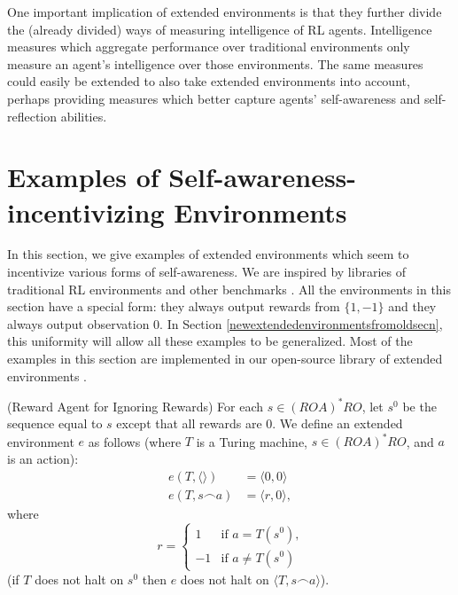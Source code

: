 \documentclass[runningheads]{llncs}
\begin{document}
One important implication of extended environments is that they further divide
the (already divided) ways of measuring intelligence of RL agents. Intelligence
measures
\cite{alexander2019intelligence} \cite{hernandez} \cite{legg2007universal}
which aggregate performance over traditional environments only measure
an agent's intelligence over those environments. The same measures could easily
be extended to also take extended environments into account, perhaps providing
measures which better capture agents' self-awareness and self-reflection abilities.

\section{Examples of Self-awareness-incentivizing Environments}
\label{basicexamplessection}

In this section, we give examples of extended environments which seem
to incentivize various forms of self-awareness. We are inspired by libraries of
traditional RL environments and other benchmarks \cite{bellemare2013arcade}
\cite{beyret2019animal} \cite{brockman2016openai} \cite{chollet2019measure}
\cite{cobbe2020leveraging}. All the environments in this section have a special
form: they always output rewards from $\{1,-1\}$ and they always output observation $0$.
In Section \ref{newextendedenvironmentsfromoldsecn},
this uniformity will allow all these examples to be generalized.
Most of the examples in this section are implemented in our open-source
library of extended environments \cite{library}.

\begin{example}
\label{rewardagentforignoringrewardsexample}
    (Reward Agent for Ignoring Rewards)
    For each $s\in (ROA)^*RO$, let $s^0$ be the sequence equal to $s$ except that
    all rewards are $0$.
    We define an extended environment $e$ as follows
    (where $T$ is a Turing machine, $s\in (ROA)^*RO$, and $a$ is an action):
    \begin{align*}
        e(T,\langle\rangle) &= \langle 0,0\rangle\\
        e(T,s\frown a)
        &= \langle r,0\rangle,
    \end{align*}
    where
    \[
        r =
        \begin{cases}
            1 & \mbox{if $a=T(s^0)$,}\\
            -1 & \mbox{if $a\not=T(s^0)$}
        \end{cases}
    \]
    (if $T$ does not halt on $s^0$ then $e$ does not halt on
    $\langle T,s\frown a\rangle$).
\end{example}
\end{document}
